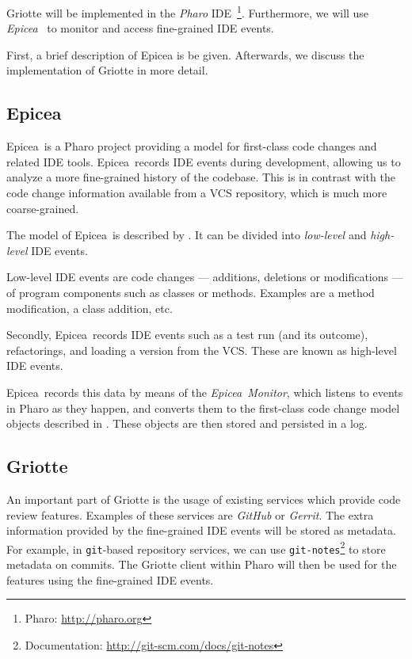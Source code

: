 \documentclass[conference,a4paper]{IEEEtran}
\newcommand{\Ep}{Epicea}
\newcommand{\code}[1]{\texttt{#1}}
\begin{document}
Griotte will be implemented in the \textit{Pharo}
IDE~\cite{Blac09a}\footnote{Pharo: \url{http://pharo.org}}.
Furthermore, we will use \textit{Epicea}~\cite{Dias13a} to monitor and
access fine-grained IDE events.

First, a brief description of Epicea is be given. Afterwards, we
discuss the implementation of Griotte in more detail.

\subsection{Epicea}
\label{sec:epicea}

\Ep\ is a Pharo project providing a model for first-class code changes
and related IDE tools. \Ep\ records IDE events during development,
allowing us to analyze a more fine-grained history of the
codebase. This is in contrast with the code change information
available from a VCS repository, which is much more coarse-grained.

The model of \Ep\ is described by . It
can be divided into \textit{low-level} and \textit{high-level} IDE
events.

Low-level IDE events are code changes --- additions, deletions or
modifications --- of program components such as classes or
methods. Examples are a method modification, a class addition, etc.

Secondly, \Ep\ records IDE events such as a test run (and its
outcome), refactorings, and loading a version from the VCS. These are
known as high-level IDE events.

\Ep\ records this data by means of the \textit{\Ep\ Monitor}, which
listens to events in Pharo as they happen, and converts them to the
first-class code change model objects described in
. These objects are then stored and
persisted in a log.

\subsection{Griotte}
\label{sec:griotte}

An important part of Griotte is the usage of existing services which
provide code review features. Examples of these services are
\textit{GitHub} or \textit{Gerrit}. The extra information provided by
the fine-grained IDE events will be stored as metadata. For example,
in \code{git}-based repository services, we can use
\code{git-notes}\footnote{Documentation:
  \url{http://git-scm.com/docs/git-notes}} to store metadata on
commits. The Griotte client within Pharo will then be used for the
features using the fine-grained IDE events.
\end{document}

